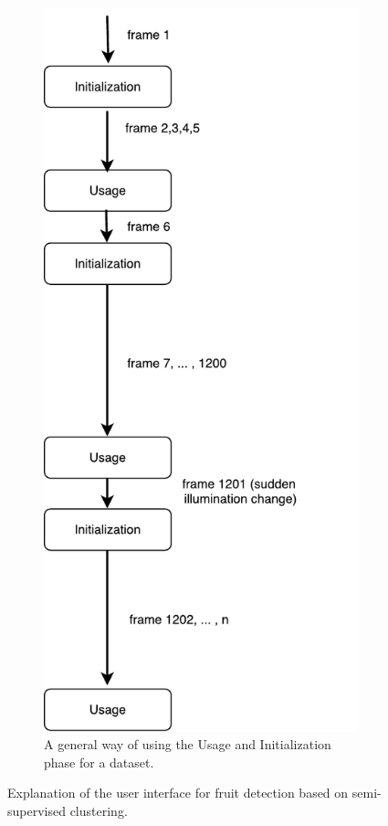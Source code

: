\begin{figure}[!hbpt]
\begin{subfigure}{0.4\textwidth}
            \includegraphics[width=\textwidth]{figures/detection/General_paradigm.pdf}                  
        \hspace*{-1cm}\caption{A general way of using the Usage and Initialization phase for a dataset.}       
        \label{fig:General_paradigm}        
        \end{subfigure}
   \caption[User interface for fruit detection based on semi-supervised clustering.]{Explanation of the user interface for fruit detection based on semi-supervised clustering.}
   \label{fig:init_genparadigm}
\end{figure}




